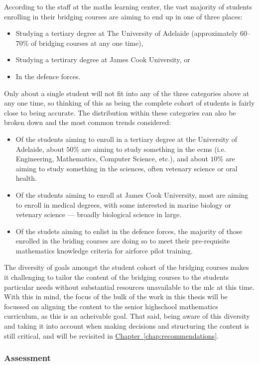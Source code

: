 \documentclass[twoside,12pt,a4paper]{report}
\newcommand{\refchap}[1]{\hyperref[chap:#1]{Chapter~\ref{chap:#1}}}
\begin{document}
According to the staff at the maths learning center, the vast majority of students enrolling in their bridging courses are aiming to end up in one of three places:
\begin{itemize}
	\item Studying a tertiary degree at The University of Adelaide (approximately $60$--$70$\% of bridging courses at any one time),
	\item Studying a tertirary degree at James Cook University, or
	\item In the defence forces.
\end{itemize}
Only about a single student will not fit into any of the three categories above at any one time, so thinking of this as being the complete cohort of students is fairly close to being accurate. The distribution within these categories can also be broken down and the most common trends considered:
\begin{itemize}
	\item Of the students aiming to enroll in a tertiary degree at the University of Adelaide, about $50$\% are aiming to study something in the \gls{ecms} (i.e. Engineering, Mathematics, Computer Science, etc.), and about $10$\% are aiming to study something in the sciences, often vetenary science or oral health.
	\item Of the students aiming to enroll at James Cook University, most are aiming to enroll in medical degrees, with some interested in marine biology or vetenary science --- broadly biological science in large.
	\item Of the studets aiming to enlist in the defence forces, the majority of those enrolled in the briding courses are doing so to meet their pre-requisite mathematics knowledge criteria for airforce pilot training.
\end{itemize}

The diversity of goals amongst the student cohort of the bridging courses makes it challenging to tailor the content of the bridging courses to the students particular needs without substantial resources unavailable to the \gls{mlc} at this time. With this in mind, the focus of the bulk of the work in this thesis will be focussed on aligning the content to the senior highschool mathematics curriculum, as this is an acheivable goal. That said, being aware of this diversity and taking it into account when making decisions and structuring the content is still critical, and will be revisited in \refchap{recommendations}.


\subsubsection{Assessment}
\end{document}
